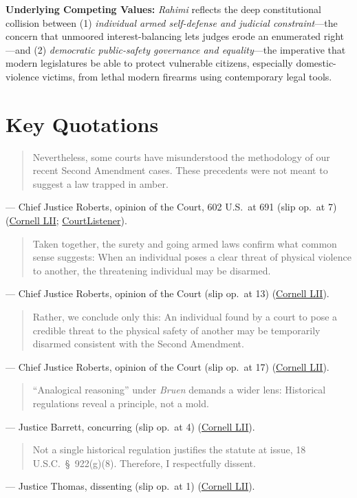 \documentclass[12pt]{article}
\begin{document}
\textbf{Underlying Competing Values:} \textit{Rahimi} reflects the deep constitutional collision between (1) \textit{individual armed self-defense and judicial constraint}---the concern that unmoored interest-balancing lets judges erode an enumerated right---and (2) \textit{democratic public-safety governance and equality}---the imperative that modern legislatures be able to protect vulnerable citizens, especially domestic-violence victims, from lethal modern firearms using contemporary legal tools.

\section{Key Quotations}

\begin{quote}
Nevertheless, some courts have misunderstood the methodology of our recent Second Amendment cases. These precedents were not meant to suggest a law trapped in amber.
\end{quote}
\noindent --- Chief Justice Roberts, opinion of the Court, 602 U.S.\ at 691 (slip op.\ at 7) (\href{https://www.law.cornell.edu/supremecourt/text/22-915}{Cornell LII}; \href{https://www.courtlistener.com/opinion/10600058/united-states-v-rahimi/}{CourtListener}).

\begin{quote}
Taken together, the surety and going armed laws confirm what common sense suggests: When an individual poses a clear threat of physical violence to another, the threatening individual may be disarmed.
\end{quote}
\noindent --- Chief Justice Roberts, opinion of the Court (slip op.\ at 13) (\href{https://www.law.cornell.edu/supremecourt/text/22-915}{Cornell LII}).

\begin{quote}
Rather, we conclude only this: An individual found by a court to pose a credible threat to the physical safety of another may be temporarily disarmed consistent with the Second Amendment.
\end{quote}
\noindent --- Chief Justice Roberts, opinion of the Court (slip op.\ at 17) (\href{https://www.law.cornell.edu/supremecourt/text/22-915}{Cornell LII}).

\begin{quote}
``Analogical reasoning'' under \textit{Bruen} demands a wider lens: Historical regulations reveal a principle, not a mold.
\end{quote}
\noindent --- Justice Barrett, concurring (slip op.\ at 4) (\href{https://www.law.cornell.edu/supremecourt/text/22-915}{Cornell LII}).

\begin{quote}
Not a single historical regulation justifies the statute at issue, 18 U.S.C.\ \S\ 922(g)(8). Therefore, I respectfully dissent.
\end{quote}
\noindent --- Justice Thomas, dissenting (slip op.\ at 1) (\href{https://www.law.cornell.edu/supremecourt/text/22-915}{Cornell LII}).
\end{document}
